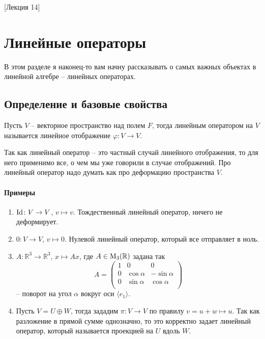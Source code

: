 [Лекция 14]

\newpage
\section{Линейные операторы}

В этом разделе я наконец-то вам начну рассказывать о самых важных объектах в линейной алгебре -- линейных операторах.

\subsection{Определение и базовые свойства}

\begin{definition}
Пусть $V$ -- векторное пространство над полем $F$, тогда линейным оператором на $V$ называется линейное отображение $\varphi \colon V\to V$.
\end{definition}

Так как линейный оператор -- это частный случай линейного отображения, то для него применимо все, о чем мы уже говорили в случае отображений. Про линейный оператор надо думать как про деформацию пространства $V$.

\paragraph{Примеры}
\begin{enumerate}
\item $\operatorname{Id}\colon V\to V$, $v\mapsto v$. Тождественный линейный оператор, ничего не деформирует.

\item $0\colon V\to V$, $v \mapsto 0$. Нулевой линейный оператор, который все отправляет в ноль.

\item $A\colon \mathbb R^3 \to \mathbb R^3$, $x\mapsto Ax$, где $A\in \operatorname{M}_{3}(\mathbb R)$ задана так
\[
A = 
\begin{pmatrix}
{1}&{0}&{0}\\
{0}&{\cos \alpha}&{-\sin \alpha}\\
{0}&{\sin \alpha}&{\cos \alpha}\\
\end{pmatrix}
\]
-- поворот на угол $\alpha$ вокруг оси $\langle e_1\rangle$.

\item Пусть $V = U\oplus W$, тогда зададим $\pi\colon V\to V$ по правилу $v = u + w \mapsto u$. Так как разложение в прямой сумме однозначно, то это корректно задает линейный оператор, который называется проекцией на $U$ вдоль $W$.
\end{enumerate}


